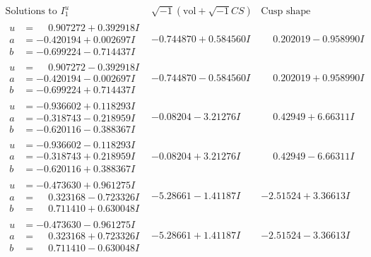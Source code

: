 \documentclass[1p]{elsarticle_modified}
\theoremstyle{definition}
\newcommand{\I}{\sqrt{-1}}
\begin{document}
$$\begin{array}{c|c|c}  
\text{Solutions to }I^u_{1}& \I (\text{vol} + \sqrt{-1}CS) & \text{Cusp shape}\\
 \hline 
\begin{aligned}
u &= \phantom{-}0.907272 + 0.392918 I \\
a &= -0.420194 + 0.002697 I \\
b &= -0.699224 - 0.714437 I\end{aligned}
 & -0.744870 + 0.584560 I & \phantom{-}0.202019 - 0.958990 I \\ \hline\begin{aligned}
u &= \phantom{-}0.907272 - 0.392918 I \\
a &= -0.420194 - 0.002697 I \\
b &= -0.699224 + 0.714437 I\end{aligned}
 & -0.744870 - 0.584560 I & \phantom{-}0.202019 + 0.958990 I \\ \hline\begin{aligned}
u &= -0.936602 + 0.118293 I \\
a &= -0.318743 - 0.218959 I \\
b &= -0.620116 - 0.388367 I\end{aligned}
 & -0.08204 - 3.21276 I & \phantom{-}0.42949 + 6.66311 I \\ \hline\begin{aligned}
u &= -0.936602 - 0.118293 I \\
a &= -0.318743 + 0.218959 I \\
b &= -0.620116 + 0.388367 I\end{aligned}
 & -0.08204 + 3.21276 I & \phantom{-}0.42949 - 6.66311 I \\ \hline\begin{aligned}
u &= -0.473630 + 0.961275 I \\
a &= \phantom{-}0.323168 - 0.723326 I \\
b &= \phantom{-}0.711410 + 0.630048 I\end{aligned}
 & -5.28661 - 1.41187 I & -2.51524 + 3.36613 I \\ \hline\begin{aligned}
u &= -0.473630 - 0.961275 I \\
a &= \phantom{-}0.323168 + 0.723326 I \\
b &= \phantom{-}0.711410 - 0.630048 I\end{aligned}
 & -5.28661 + 1.41187 I & -2.51524 - 3.36613 I \\ \hline\begin{aligned}

\end{aligned}
\end{array}$$
\end{document}
